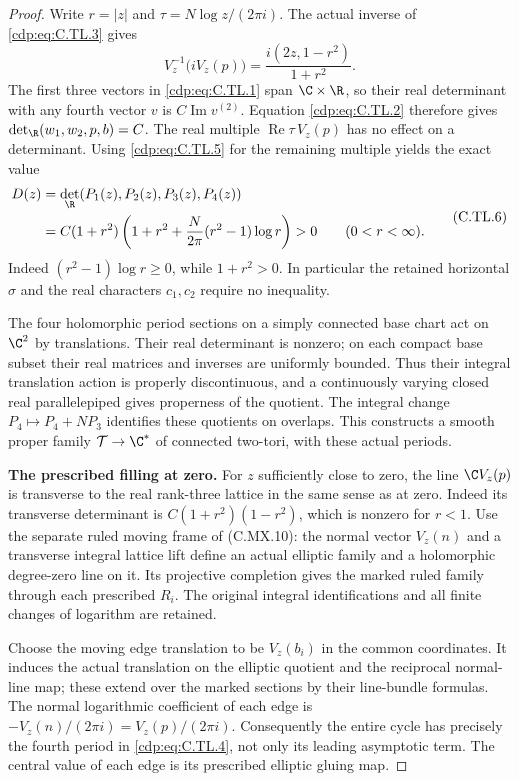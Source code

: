 \begin{proof}
Write $r=|z|$ and $\tau=N\log z/(2\pi i)$. The actual inverse
of \eqref{cdp:eq:C.TL.3} gives
\[
 V_z^{-1}\bigl(iV_z(p)\bigr)
       =\frac{i(2z,1-r^2)}{1+r^2}.
 \tag{C.TL.5}\label{cdp:eq:C.TL.5}
\]
The first three vectors in \eqref{cdp:eq:C.TL.1} span $\C\times\R$, so
their real determinant with any fourth vector $v$ is
$C\operatorname{Im}v^{(2)}$. Equation \eqref{cdp:eq:C.TL.2} therefore gives
$\det_{\R}(w_1,w_2,p,b)=C$. The real multiple
$\operatorname{Re}\tau\,V_z(p)$ has no effect on a determinant.
Using \eqref{cdp:eq:C.TL.5} for the remaining multiple yields the exact value
\[
 \begin{aligned}
 D(z)&=\det_{\R}(P_1(z),P_2(z),P_3(z),P_4(z))\\
 &=C(1+r^2)
       \left(1+r^2+\frac{N}{2\pi}(r^2-1)\log r\right)>0
                         \qquad (0<r<\infty).
 \end{aligned}
 \tag{C.TL.6}\label{cdp:eq:C.TL.6}
\]
Indeed $(r^2-1)\log r\geq0$, while $1+r^2>0$.
In particular the retained horizontal $\sigma$ and the real
characters $c_1,c_2$ require no inequality.

The four holomorphic period sections on a simply connected
base chart act on $\C^2$ by translations. Their real determinant
is nonzero; on each compact base subset their real matrices and
inverses are uniformly bounded. Thus their integral translation
action is properly discontinuous, and a continuously varying
closed real parallelepiped gives properness of the quotient.
The integral change $P_4\mapsto P_4+NP_3$ identifies these
quotients on overlaps. This constructs a smooth proper family
$\mathcal T\to\C^*$ of connected two-tori, with these actual
periods.

\par\medskip\noindent\textbf{The prescribed filling at zero.}
For $z$ sufficiently close to zero, the line
$\C V_z(p)$ is transverse to the real rank-three lattice in
the same sense as at zero. Indeed its transverse determinant
is $C(1+r^2)(1-r^2)$, which is nonzero for $r<1$.
Use the separate ruled moving frame of (C.MX.10):
the normal vector $V_z(n)$ and a transverse integral lattice
lift define an actual elliptic family and a holomorphic
degree-zero line on it. Its projective completion gives the
marked ruled family through each prescribed $R_i$.
The original integral identifications and all finite changes
of logarithm are retained.

Choose the moving edge translation to be $V_z(b_i)$ in the
common coordinates. It induces the actual translation on the
elliptic quotient and the reciprocal normal-line map; these
extend over the marked sections by their line-bundle formulas.
The normal logarithmic coefficient of each edge is
$-V_z(n)/(2\pi i)=V_z(p)/(2\pi i)$. Consequently the entire
cycle has precisely the fourth period in \eqref{cdp:eq:C.TL.4}, not only
its leading asymptotic term. The central value of each edge
is its prescribed elliptic gluing map.


\end{proof}
